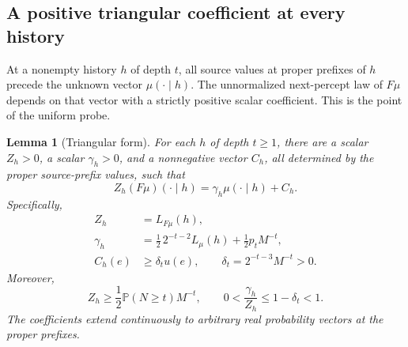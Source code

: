 \documentclass[11pt]{article}
\newtheorem{lemma}[theorem]{Lemma}
\theoremstyle{definition}
\theoremstyle{remark}
\newcommand{\Prob}{\mathbb P}
\begin{document}
\subsection{A positive triangular coefficient at every history}

At a nonempty history $h$ of depth $t$, all source values at proper
prefixes of $h$ precede the unknown vector $\mu(\cdot\mid h)$.
The unnormalized next-percept law of $F\mu$ depends on that vector
with a strictly positive scalar coefficient.  This is the point of
the uniform probe.

\begin{lemma}[Triangular form]
\label{lem:triangular}
For each $h$ of depth $t\ge1$, there are a scalar $Z_h>0$, a scalar
$\gamma_h>0$, and a nonnegative vector $C_h$, all determined by the
proper source-prefix values, such that
\begin{equation}
  Z_h(F\mu)(\cdot\mid h)=
       \gamma_h\mu(\cdot\mid h)+C_h.
  \label{eq:triangular}
\end{equation}
Specifically,
\begin{align}
  Z_h&=L_{F\mu}(h),
     \label{eq:z-definition}\\
  \gamma_h&=\frac12\,2^{-t-2}L_\mu(h)
             +\frac12p_tM^{-t},
     \label{eq:gamma}\\
  C_h(e)&\ge\delta_t u(e),
  \qquad\delta_t=2^{-t-3}M^{-t}>0.
     \label{eq:delta}
\end{align}
Moreover,
\begin{equation}
  Z_h\ge\frac12\Prob(N\ge t)M^{-t},\qquad
  0<\frac{\gamma_h}{Z_h}\le1-\delta_t<1.
  \label{eq:triangular-bounds}
\end{equation}
The coefficients extend continuously to arbitrary real probability
vectors at the proper prefixes.
\end{lemma}
\end{document}

